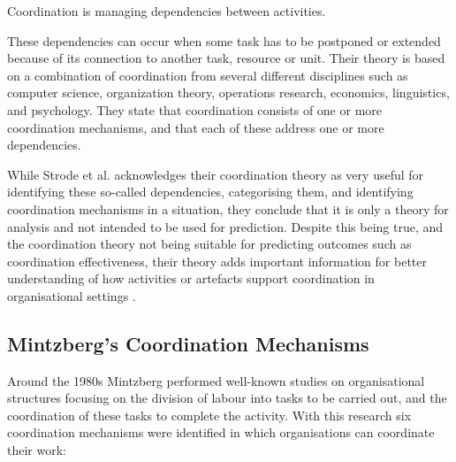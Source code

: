 \begin{fancyquotes}
Coordination is managing dependencies between activities.
\end{fancyquotes}

These dependencies can occur when some task has to be postponed or extended because of its connection to another task, resource or unit. Their theory is based on a combination of coordination from several different disciplines such as computer science, organization theory, operations research, economics, linguistics, and psychology. They state that coordination consists of one or more coordination mechanisms, and that each of these address one or more dependencies.

While Strode et al. acknowledges their coordination theory as very useful for identifying these so-called dependencies, categorising them, and identifying coordination mechanisms in a situation, they conclude that it is only a theory for analysis and not intended to be used for prediction. Despite this being true, and the coordination theory not being suitable for predicting outcomes such as coordination effectiveness, their theory adds important information for better understanding of how activities or artefacts support coordination in organisational settings \cite{Strode2012}.

\subsection{Mintzberg's Coordination Mechanisms}


Around the 1980s Mintzberg performed well-known studies on organisational structures focusing on the division of labour into tasks to be carried out, and the coordination of these tasks to complete the activity. With this research six coordination mechanisms were identified in which organisations can coordinate their work:

